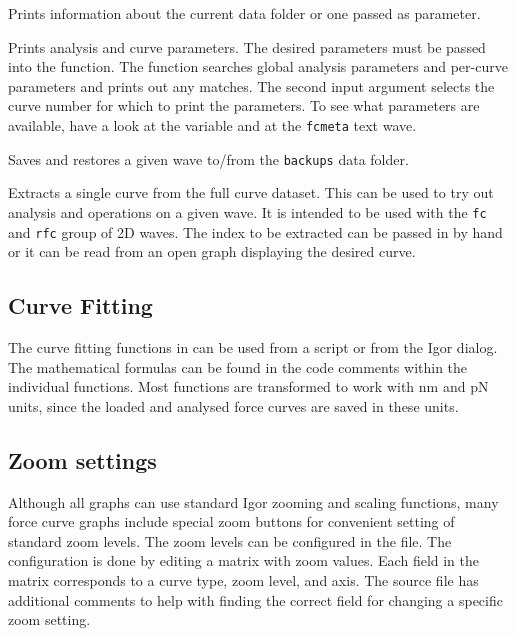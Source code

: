 \documentclass[12pt,a4paper]{article}
\begin{document}
\begin{description}[style=nextline]

\item[PrintInfo, PrintInfoDF]
Prints information about the current data folder or one passed as parameter.

\item[PrintParams]
Prints analysis and curve parameters. The desired parameters must be passed into the function. The function searches global analysis parameters and per-curve parameters and prints out any matches. The second input argument selects the curve number for which to print the parameters.
To see what parameters are available, have a look at the  variable and at the \texttt{fcmeta} text wave.

\item[SaveBackupWave, RestoreBackupWave]
Saves and restores a given wave to/from the \texttt{backups} data folder.

\item[MakeTempCurve]
Extracts a single curve from the full curve dataset. This can be used to try out analysis and operations on a given wave. It is intended to be used with the \texttt{fc} and \texttt{rfc} group of 2D waves.
The index to be extracted can be passed in by hand or it can be read from an open graph displaying the desired curve.

\end{description}

\subsection{Curve Fitting}
The curve fitting functions in  can be used from a script or from the Igor  dialog. The mathematical formulas can be found in the code comments within the individual functions.
Most functions are transformed to work with \si{nm} and \si{pN} units, since the loaded and analysed force curves are saved in these units.


\subsection{Zoom settings}
\label{sec:afmsoftware-zoom}
Although all graphs can use standard Igor zooming and scaling functions, many force curve graphs include special zoom buttons for convenient setting of standard zoom levels.
The zoom levels can be configured in the  file.
The configuration is done by editing a matrix with zoom values. Each field in the matrix corresponds to a curve type, zoom level, and axis.
The source file has additional comments to help with finding the correct field for changing a specific zoom setting.
\end{document}
